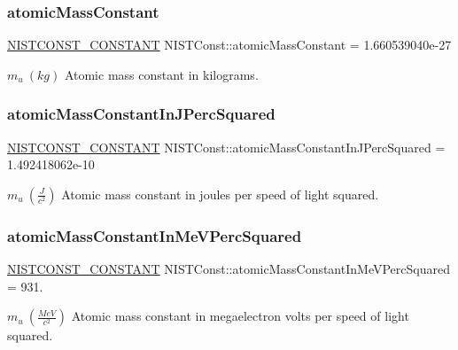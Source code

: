 \subsubsection{\texorpdfstring{atomic\+Mass\+Constant}{atomicMassConstant}}
{\footnotesize\ttfamily \mbox{\hyperlink{group___n_i_s_t_const-_macros_ga2b0fc1d7452373f816175dd86ce26729}{N\+I\+S\+T\+C\+O\+N\+S\+T\+\_\+\+C\+O\+N\+S\+T\+A\+NT}} N\+I\+S\+T\+Const\+::atomic\+Mass\+Constant = 1.\+660539040e-\/27}

$m_u \ (kg)$ Atomic mass constant in kilograms. \mbox{\label{group___n_i_s_t_const-_atomic_mass_constant_ga2e051baa0d89927080288e2289ac0346}} 
\subsubsection{\texorpdfstring{atomic\+Mass\+Constant\+In\+J\+Perc\+Squared}{atomicMassConstantInJPercSquared}}
{\footnotesize\ttfamily \mbox{\hyperlink{group___n_i_s_t_const-_macros_ga2b0fc1d7452373f816175dd86ce26729}{N\+I\+S\+T\+C\+O\+N\+S\+T\+\_\+\+C\+O\+N\+S\+T\+A\+NT}} N\+I\+S\+T\+Const\+::atomic\+Mass\+Constant\+In\+J\+Perc\+Squared = 1.\+492418062e-\/10}

$m_u \ (\frac{J}{c^2})$ Atomic mass constant in joules per speed of light squared. \mbox{\label{group___n_i_s_t_const-_atomic_mass_constant_ga050dd5d7f3c4ee37a9ff7456ce82f8d2}} 
\subsubsection{\texorpdfstring{atomic\+Mass\+Constant\+In\+Me\+V\+Perc\+Squared}{atomicMassConstantInMeVPercSquared}}
{\footnotesize\ttfamily \mbox{\hyperlink{group___n_i_s_t_const-_macros_ga2b0fc1d7452373f816175dd86ce26729}{N\+I\+S\+T\+C\+O\+N\+S\+T\+\_\+\+C\+O\+N\+S\+T\+A\+NT}} N\+I\+S\+T\+Const\+::atomic\+Mass\+Constant\+In\+Me\+V\+Perc\+Squared = 931.}

$m_u \ (\frac{MeV}{c^2})$ Atomic mass constant in megaelectron volts per speed of light squared. 